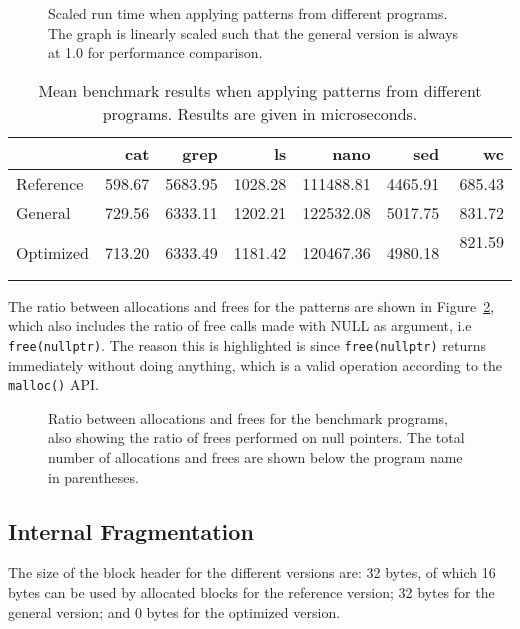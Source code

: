 \begin{figure}[H]
    \centering
    
    \caption{Scaled run time when applying patterns from different programs. The graph is linearly scaled such that the general version is always at 1.0 for performance comparison.}
    \label{fig:program_benchmarks}
\end{figure}

\begin{table}[H]
    \centering
    \begin{tabular}{lrrrrrr}
    {} & {cat} & {grep} & {ls} & {nano} & {sed} & {wc} \\
    \midrule
    Reference & 598.67 & 5683.95 & 1028.28 & 111488.81 & 4465.91 & 685.43 \\
    General & 729.56 & 6333.11 & 1202.21 & 122532.08 & 5017.75 & 831.72 \\
    Optimized & 713.20 & 6333.49 & 1181.42 & 120467.36 & 4980.18 & 821.59 \
    \end{tabular}
    \caption{Mean benchmark results when applying patterns from different programs. Results are given in microseconds.}
    \label{table:program_benchmarks}
\end{table}

The ratio between allocations and frees for the patterns are shown in Figure~\ref{fig:program_ratios}, which also includes the ratio of free calls made with NULL as argument, i.e \texttt{free(nullptr)}. The reason this is highlighted is since \texttt{free(nullptr)} returns immediately without doing anything, which is a valid operation according to the \texttt{malloc()} API.

\begin{figure}[H]
    \centering
    
    \caption{Ratio between allocations and frees for the benchmark programs, also showing the ratio of frees performed on null pointers. The total number of allocations and frees are shown below the program name in parentheses.}
    \label{fig:program_ratios}
\end{figure}

\subsection{Internal Fragmentation}

The size of the block header for the different versions are: 32 bytes, of which 16 bytes can be used by allocated blocks for the reference version; 32 bytes for the general version; and 0 bytes for the optimized version. 

